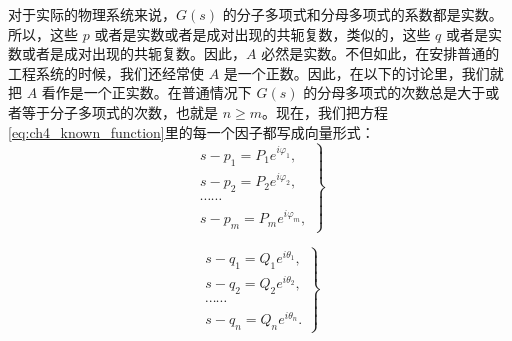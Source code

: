 对于实际的物理系统来说，$G(s)$ 的分子多项式和分母多项式的系数都是实数。所以，这些 $p$ 或者是实数或者是成对出现的共轭复数，类似的，这些 $q$ 或者是实数或者是成对出现的共轭复数。因此，$A$ 必然是实数。不但如此，在安排普通的工程系统的时候，我们还经常使 $A$ 是一个正数。因此，在以下的讨论里，我们就把 $A$ 看作是一个正实数。在普通情况下 $G(s)$ 的分母多项式的次数总是大于或者等于分子多项式的次数，也就是 $n \geq m$。现在，我们把方程 \eqref{eq:ch4_known_function}里的每一个因子都写成向量形式：
\begin{equation}\label{eq:ch4_numerator_vector_format}
\left.
\begin{array}{l}
s - p_1 = P_1 e^{i \varphi_1},\\
s - p_2 = P_2 e^{i \varphi_2},\\
\cdots\cdots\\
s - p_m = P_m e^{i \varphi_m},
\end{array}
\right\}
\end{equation}

\begin{equation}\label{eq:ch4_denominator_vector_format}
\left.
\begin{array}{l}
s - q_1 = Q_1 e^{i \theta_1},\\
s - q_2 = Q_2 e^{i \theta_2},\\
\cdots\cdots\\
s - q_n = Q_n e^{i \theta_n}.
\end{array}
\right\}
\end{equation}

